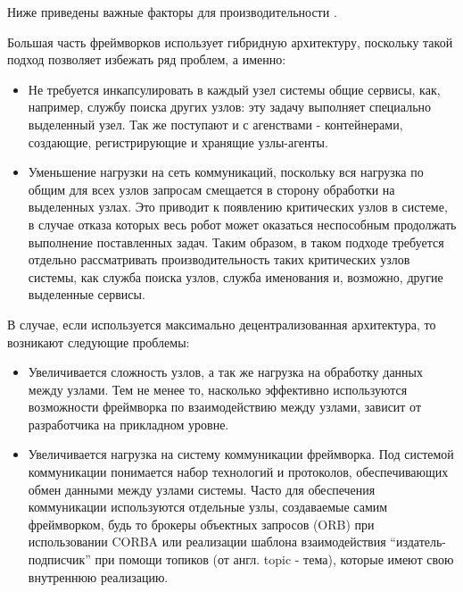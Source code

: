 Ниже приведены важные факторы для производительности \marm{} \cite{blasco2012multiagent}.

\begin{description}[noitemsep]
	
	\item [Тип архитектуры.] Большая часть фреймворков использует гибридную архитектуру, поскольку такой подход позволяет избежать ряд проблем, а именно:
	\begin{itemize}[noitemsep]
		\item Не требуется инкапсулировать в каждый узел системы общие сервисы, как, например, службу поиска других узлов: эту задачу выполняет специально выделенный узел. Так же поступают и с агенствами - контейнерами, создающие, регистрирующие и хранящие узлы-агенты.
		\item Уменьшение нагрузки на сеть коммуникаций, поскольку вся нагрузка по общим для всех узлов запросам смещается в сторону обработки на выделенных узлах. Это приводит к появлению критических узлов в системе, в случае отказа которых весь робот может оказаться неспособным продолжать выполнение поставленных задач. Таким образом, в таком подходе требуется отдельно рассматривать производительность таких критических узлов системы, как служба поиска узлов, служба именования и, возможно, другие выделенные сервисы.
	\end{itemize}
	В случае, если используется максимально децентрализованная архитектура, то возникают следующие проблемы:
	\begin{itemize}[noitemsep]
		\item Увеличивается сложность узлов, а так же нагрузка на обработку данных между узлами. Тем не менее то, насколько эффективно используются возможности фреймворка по взаимодействию между узлами, зависит от разработчика на прикладном уровне.
		\item Увеличивается нагрузка на систему коммуникации фреймворка. Под системой коммуникации понимается набор технологий и протоколов, обеспечивающих обмен данными между узлами системы. Часто для обеспечения коммуникации используются отдельные узлы, создаваемые самим фреймворком, будь то брокеры объектных запросов (ORB) при использовании CORBA или реализации шаблона взаимодействия \enquote{издатель-подписчик} при помощи топиков (от англ. topic - тема), которые имеют свою внутреннюю реализацию.
	\end{itemize}


\end{description}
